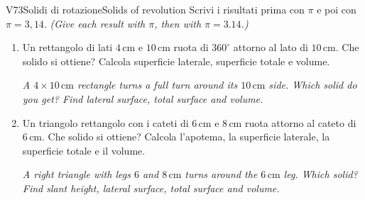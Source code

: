 \documentclass[11pt,a4paper]{article}
\newcommand{\en}[1]{\par{\small\itshape\color{engray}#1\par}}
\newcommand{\enx}[1]{{\small\itshape\color{engray}(#1)}}
\newcommand{\unit}[1]{\,\mathrm{#1}}
\newcommand{\cm}{\unit{cm}}
\begin{document}
\begin{esercizio}{V7}{3}{Solidi di rotazione}{Solids of revolution}
Scrivi i risultati prima con $\pi$ e poi con $\pi=3,14$. \enx{Give each result with $\pi$, then with $\pi = 3.14$.}
\begin{enumerate}
\item Un rettangolo di lati $4\cm$ e $10\cm$ ruota di $360^\circ$ attorno al lato di $10\cm$. Che solido si ottiene? Calcola superficie laterale, superficie totale e volume.
\en{A $4 \times 10\cm$ rectangle turns a full turn around its $10\cm$ side. Which solid do you get? Find lateral surface, total surface and volume.}
\item Un triangolo rettangolo con i cateti di $6\cm$ e $8\cm$ ruota attorno al cateto di $6\cm$. Che solido si ottiene? Calcola l'apotema, la superficie laterale, la superficie totale e il volume.
\en{A right triangle with legs $6$ and $8\cm$ turns around the $6\cm$ leg. Which solid? Find slant height, lateral surface, total surface and volume.}
\end{enumerate}
\end{esercizio}
\end{document}
